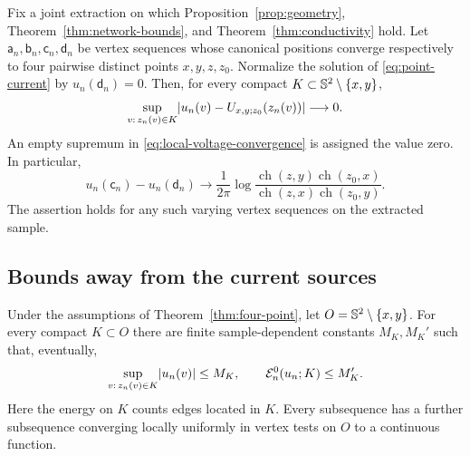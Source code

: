 \begin{theorem}\label{thm:four-point}
Fix a joint extraction on which
Proposition~\ref{prop:geometry}, Theorem~\ref{thm:network-bounds}, and
Theorem~\ref{thm:conductivity} hold.  Let
\(\mathsf a_n,\mathsf b_n,\mathsf c_n,\mathsf d_n\) be vertex
sequences whose canonical positions converge respectively to four
pairwise distinct points \(x,y,z,z_0\).  Normalize the solution of
\eqref{eq:point-current} by \(u_n(\mathsf d_n)=0\).  Then, for every compact
\(K\subset\mathbb S^2\setminus\{x,y\}\),
\begin{equation}\label{eq:local-voltage-convergence}
 \sup_{v:\,z_n(v)\in K}
    \lvert u_n(v)-U_{x,y;z_0}(z_n(v))\rvert\longrightarrow0.
\end{equation}
An empty supremum in \eqref{eq:local-voltage-convergence} is assigned
the value zero.
In particular,
\[
 u_n(\mathsf c_n)-u_n(\mathsf d_n)\longrightarrow
 \frac1{2\pi}
       \log\frac{\operatorname{ch}(z,y)\operatorname{ch}(z_0,x)}
                     {\operatorname{ch}(z,x)\operatorname{ch}(z_0,y)}.
\]
The assertion holds for any such varying vertex sequences on the
extracted sample.
\end{theorem}

\subsection{Bounds away from the current sources}

\begin{lemma}\label{lem:voltage-bounds}
Under the assumptions of Theorem~\ref{thm:four-point}, let
\(O=\mathbb S^2\setminus\{x,y\}\).  For every compact \(K\subset O\) there
are finite sample-dependent constants \(M_K,M_K'\) such that, eventually,
\[
 \sup_{v:\,z_n(v)\in K}\lvert u_n(v)\rvert\le M_K,
 \qquad
 \mathcal E_n^0(u_n;K)\le M_K'.
\]
Here the energy on \(K\) counts edges located in \(K\).
Every subsequence has a further subsequence converging locally uniformly
in vertex tests on \(O\) to a continuous function.
\end{lemma}


